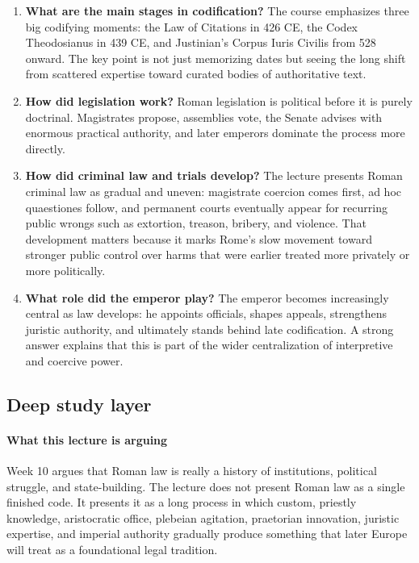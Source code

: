 \documentclass[11pt]{article}
\begin{document}
\begin{enumerate}
\item \textbf{What are the main stages in codification?} The course emphasizes three big codifying moments: the Law of Citations in 426 CE, the Codex Theodosianus in 439 CE, and Justinian's Corpus Iuris Civilis from 528 onward. The key point is not just memorizing dates but seeing the long shift from scattered expertise toward curated bodies of authoritative text.
\item \textbf{How did legislation work?} Roman legislation is political before it is purely doctrinal. Magistrates propose, assemblies vote, the Senate advises with enormous practical authority, and later emperors dominate the process more directly.
\item \textbf{How did criminal law and trials develop?} The lecture presents Roman criminal law as gradual and uneven: magistrate coercion comes first, ad hoc quaestiones follow, and permanent courts eventually appear for recurring public wrongs such as extortion, treason, bribery, and violence. That development matters because it marks Rome's slow movement toward stronger public control over harms that were earlier treated more privately or more politically.
\item \textbf{What role did the emperor play?} The emperor becomes increasingly central as law develops: he appoints officials, shapes appeals, strengthens juristic authority, and ultimately stands behind late codification. A strong answer explains that this is part of the wider centralization of interpretive and coercive power.
\end{enumerate}

\subsection{Deep study layer}

\paragraph{What this lecture is arguing}

Week 10 argues that Roman law is really a history of institutions, political struggle, and state-building. The lecture does not present Roman law as a single finished code. It presents it as a long process in which custom, priestly knowledge, aristocratic office, plebeian agitation, praetorian innovation, juristic expertise, and imperial authority gradually produce something that later Europe will treat as a foundational legal tradition.
\end{document}
